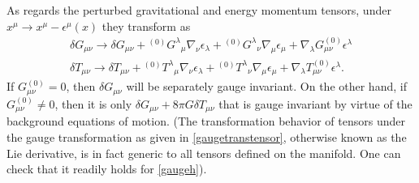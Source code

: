 \documentclass[10pt,letterpaper]{article}
\numberwithin{equation}{section}
\begin{document}
\indent As regards the perturbed gravitational and energy momentum tensors, under $x^\mu \to x^\mu - \epsilon^\mu(x)$ they transform as
\begin{eqnarray}
\delta G_{\mu\nu} \to \delta G_{\mu\nu} + {}^{(0)}G^\lambda{}_\mu \nabla_\nu \epsilon_\lambda +  {}^{(0)}G^{\lambda}{}_{\nu}\nabla_\mu \epsilon_\mu + \nabla_\lambda  G^{(0)}_{\mu\nu} \epsilon^\lambda
\nonumber\\
\delta T_{\mu\nu} \to \delta T_{\mu\nu} + {}^{(0)}T^\lambda{}_\mu \nabla_\nu \epsilon_\lambda +  {}^{(0)}T^{\lambda}{}_{\nu}\nabla_\mu \epsilon_\mu + \nabla_\lambda  T^{(0)}_{\mu\nu} \epsilon^\lambda.
\label{gaugetranstensor}
\end{eqnarray}
If $G_{\mu\nu}^{(0)}=0$, then $\delta G_{\mu\nu}$ will be separately gauge invariant. On the other hand, if $ G_{\mu\nu}^{(0)} \ne 0$, then it is only $\delta G_{\mu\nu} + 8\pi G \delta T_{\mu\nu}$ that is gauge invariant by virtue of the background equations of motion. (The transformation behavior of tensors under the gauge transformation as given in \eqref{gaugetranstensor}, otherwise known as the Lie derivative, is in fact generic to all tensors defined on the manifold. One can check that it readily holds for \eqref{gaugeh}). 
\end{document}
